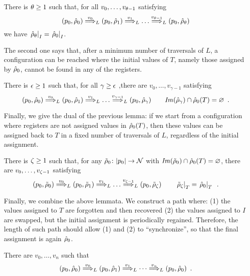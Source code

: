 %
\begin{lemma} 
\label{lem:idI}
There is $\theta \geq 1$ such that, for all $v_0,\dots,v_{\theta-1}$ satisfying
\[
	(p_0,\hat{\rho}_0) \overset{v_0}{\Longrightarrow}_{L} (p_0,\hat{\rho}_1) \overset{v_1}{\Longrightarrow}_{L} \dots \overset{v_{\theta-1}}{\Longrightarrow}_{L} (p_0,\hat{\rho}_\theta)
\]
we have $\left. \hat{\rho}_\theta \right|_{I} = \left. \hat{\rho}_0 \right|_{I}$.
\end{lemma}
%
The second one says that, after a minimum number of traversals of $L$, a configuration can be reached where the initial values of $T$, namely those assigned by $\hat{\rho}_0$, cannot be found in any of the registers.
%
\begin{lemma}
There is $\epsilon \geq 1$ such that, for all $\gamma \geq \epsilon$ ,there are $v_0,\dots,v_{\gamma-1}$ satisfying
\[
	(p_0,\hat{\rho}_0) \overset{v_0}{\Longrightarrow}_{L} (p_0,\hat{\rho}_1) \overset{v_1}{\Longrightarrow}_{L} \dots \overset{v_{\gamma-1}}{\Longrightarrow}_{L} (p_0,\hat{\rho}_\gamma)
	\qquad 
	\mathit{Im}(\hat{\rho}_\gamma) \cap \hat{\rho}_0(T) = \varnothing \enspace .
\]
\label{lem:forgetT}
\end{lemma}
%
%
Finally, we give the dual of the previous lemma: if we start from a configuration where registers are not assigned values in $\hat{\rho}_0(T)$, then these values can be assigned back to $T$ in a fixed number of traversals of $L$, regardless of the initial assignment.

\begin{lemma}
There is $\zeta \geq 1$ such that,
for any $\tilde{\rho}_0 \colon |p_0| \to \mathcal{N}$ with $\mathit{Im}(\tilde{\rho}_0) \cap \hat{\rho}_0(T) = \varnothing$, there are $v_0,\dots,v_{\zeta-1}$ satisfying
\[
	(p_0,\tilde{\rho}_0) \overset{v_0}{\Longrightarrow}_{L} (p_0,\tilde{\rho}_1) \overset{v_1}{\Longrightarrow}_{L} \dots \overset{v_{\zeta-1}}{\Longrightarrow}_{L} (p_0,\tilde{\rho}_\zeta)	
	\qquad
	\left.\tilde{\rho}_\zeta\right|_{T} = \left.\hat{\rho}_0\right|_{T} \enspace .
\]
\label{lem:initT}
\end{lemma}
%
\vspace{-4ex}
%
Finally, we combine the above lemmata. We construct a path where: (1) the values assigned to $T$ are forgotten and then recovered (2) the values assigned to $I$ are swapped, but the initial assignment is periodically regained. Therefore, the length of such path should allow (1) and (2) to ``synchronize'', so that the final assignment is again $\hat{\rho}_0$.

\begin{theorem}
\label{thm:loop}


There are $v_0,\dots,v_n$ such that
\[
	(p_0, \hat{\rho}_0) \overset{v_0}{\Longrightarrow}_{L} (p_0, \hat{\rho}_1) \overset{v_1}{\Longrightarrow}_{L} \cdots \overset{v_n}{\Longrightarrow}_{L} (p_0,\hat{\rho}_0) \enspace .
\]
\end{theorem}

